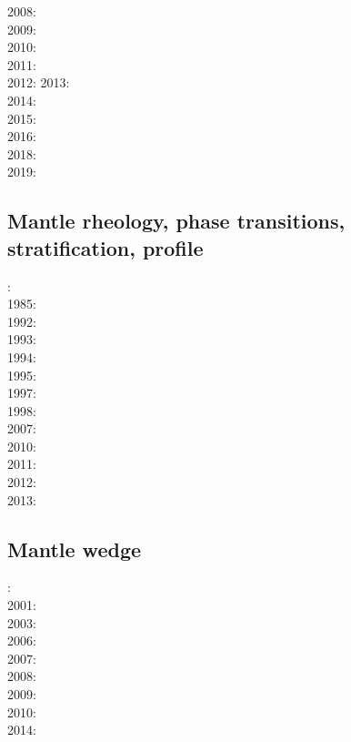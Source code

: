2008: \cite{tack08}\cite{chhl08}\\
2009: \cite{wodd09}\cite{fobe09}\\
2010: \cite{bumb10}\\
2011: \cite{lowm11}\cite{rota11}\cite{woda11}\\
2012: \cite{bisa12}\cite{cort12b}
2013: \cite{holj13}\cite{dadb13}\cite{toyd13}\cite{bogs13a}\cite{busa13}\cite{mika13}\cite{fabc13}\\
2014: \cite{arfw14}\cite{helo14}\cite{crta14}\cite{flgw14}\\
2015: \cite{thkp15}\\
2016: \cite{frbs16}\cite{sisc16}\\
2018: \cite{cold18}\cite{arcf18}\\
2019: \cite{gult19}\cite{mazh19}

\subsection*{Mantle rheology, phase transitions, stratification, profile}

: \cite{yusb82}\cite{chri82}\\
1985: \cite{chyu85}\\
1992: \cite{zhyh92}\\
1993: \cite{tasg93}\\
1994: \cite{vayv94}\\
1995: \cite{zhyu95}\cite{chri95}\\
1997: \cite{mifo97}\\
1998: \cite{cava98}\\
2007: \cite{pazw07}\\
2010: \cite{kayy10}\\
2011: \cite{java11}\cite{faff11}\\
2012: \cite{tack12}\\
2013: \cite{fakc13}


\subsection*{Mantle wedge}

: \cite{tosl78}\\
2001: \cite{bigu01}\\
2003: \cite{vank03}\\
2006: \cite{gogc06}\cite{gecy06}\\
2007: \cite{gogc07}\\
2008: \cite{knva08}\\
2009: \cite{leki09}\\
2010: \cite{roms10}\\
2014: \cite{ledg14}

